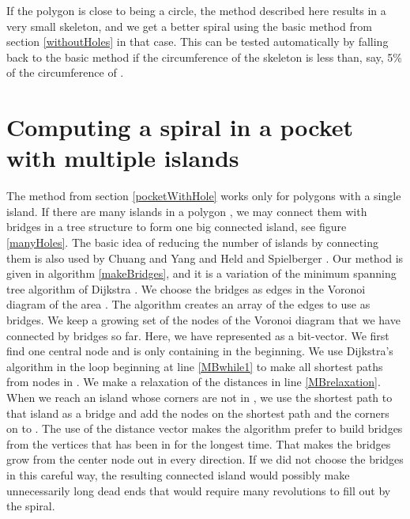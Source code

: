 \documentclass[3p]{elsarticle}
\begin{document}
If the polygon is close to being a circle, the method described here
results in a very small skeleton, and we get a better spiral using the
basic method from section \ref{withoutHoles} in that case.
This can be tested automatically by falling back to the basic method if
the circumference of the skeleton is less than, say, 5\% of the circumference of .

\section{Computing a spiral in a pocket with multiple islands}\label{multipleHoles}

\begin{figure*}
\centering
{}\quad
{}
\caption{
 A polygon with 13 islands. The bridges chosen among the Voronoi
edges to connect the islands are blue. The remaining Voronoi edges are red.
 The resulting spiral around the islands.
}
\label{manyHoles}
\end{figure*}

The method from section \ref{pocketWithHole} works only for polygons with a single island.
If there are many islands  in a polygon ,
we may connect them with bridges in a tree structure to form one
big connected island, see figure \ref{manyHoles}.
The basic idea of reducing the number of islands by connecting them is also used
by Chuang and Yang \cite{chuang2007} and Held and Spielberger \cite{held2014}.
Our method is given in algorithm \ref{makeBridges}, and it is a variation of the minimum spanning
tree algorithm of Dijkstra \cite{dijkstra1959}.
We choose the bridges as edges in the Voronoi diagram  of the area
.
The algorithm creates an array  of the edges to use as bridges.
We keep a growing set  of the nodes of the Voronoi diagram that we have
connected by bridges so far. Here, we have represented  as a bit-vector.
We first find one central node  and  is only containing  in the beginning.
We use Dijkstra's algorithm \cite{dijkstra1959} in the loop beginning at line \ref{MBwhile1}
to make all shortest paths from nodes in . We make a relaxation of the distances in line \ref{MBrelaxation}. When we reach
an island  whose corners are not in ,
we use the shortest path to that island as a bridge and add the nodes on the shortest path
and the corners on  to . The use of the distance vector  makes the algorithm
prefer to build bridges from the vertices that has been in  for the longest time.
That makes the bridges grow from the center node  out in every direction.
If we did not choose the bridges in this careful way, the resulting connected island
would possibly make unnecessarily long dead ends that would require many
revolutions to fill out by the spiral.
\end{document}
